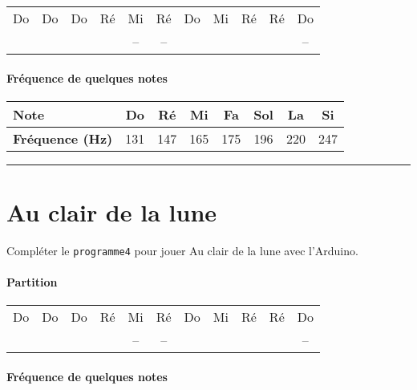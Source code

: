\documentclass[12pt,a4paper]{article}
\begin{document}
\begin{center}
\begin{tabular}{|ccccccccccc|}
\hline
Do 		& Do 		& Do 		& Ré 		& Mi 		& Ré 		& Do 		& Mi 		& Ré 		& Ré 		& Do \\
\cdot	& \cdot	& \cdot	& \cdot	& --			& --			& \cdot	& \cdot	& \cdot	& \cdot	& -- \\
\hline
\end{tabular}
\end{center}

\paragraph{Fréquence de quelques notes}

\begin{center}
\begin{tabular}{l|c|c|c|c|c|c|c}
\textbf{Note}						& \textbf{Do} & \textbf{Ré} & \textbf{Mi} & \textbf{Fa} & \textbf{Sol} & \textbf{La} & \textbf{Si} \\
\hline
\textbf{Fréquence (Hz)} 	& 131 & 147 & 165 & 175 & 196 & 220 & 247 \\
\end{tabular}
\end{center}

\hrule{}

\section*{Au clair de la lune}

Compléter le \texttt{programme4} pour jouer \og Au clair de la lune \fg{} avec l'Arduino.

\paragraph{Partition}

\begin{center}
\begin{tabular}{|ccccccccccc|}
\hline
Do 		& Do 		& Do 		& Ré 		& Mi 		& Ré 		& Do 		& Mi 		& Ré 		& Ré 		& Do \\
\cdot	& \cdot	& \cdot	& \cdot	& --			& --			& \cdot	& \cdot	& \cdot	& \cdot	& -- \\
\hline
\end{tabular}
\end{center}

\paragraph{Fréquence de quelques notes}
\end{document}
